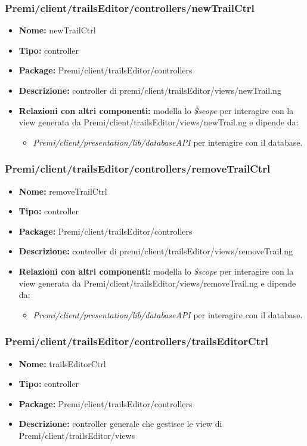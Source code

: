 \subsubsection{Premi/client/trailsEditor/controllers/newTrailCtrl}
\begin{itemize}
  \item[] \textbf{Nome:} newTrailCtrl
  \item[] \textbf{Tipo:} controller
  \item[] \textbf{Package:} Premi/client/trailsEditor/controllers
  \item[] \textbf{Descrizione:} controller di premi/client/trailsEditor/views/newTrail.ng
  \item[] \textbf{Relazioni con altri componenti:} modella lo \textit{\$scope} per interagire con la view generata da Premi/client/trailsEditor/views/newTrail.ng e dipende da:
  \begin{itemize}
  	\item \textit{Premi/client/presentation/lib/databaseAPI} per interagire con il database.
  \end{itemize}
\end{itemize}
\subsubsection{Premi/client/trailsEditor/controllers/removeTrailCtrl}
\begin{itemize}
  \item[] \textbf{Nome:} removeTrailCtrl
  \item[] \textbf{Tipo:} controller
  \item[] \textbf{Package:} Premi/client/trailsEditor/controllers
  \item[] \textbf{Descrizione:} controller di premi/client/trailsEditor/views/removeTrail.ng
  \item[] \textbf{Relazioni con altri componenti:} modella lo \textit{\$scope} per interagire con la view generata da Premi/client/trailsEditor/views/removeTrail.ng e dipende da:
  \begin{itemize}
  	\item \textit{Premi/client/presentation/lib/databaseAPI} per interagire con il database.
  \end{itemize}
\end{itemize}
\subsubsection{Premi/client/trailsEditor/controllers/trailsEditorCtrl}
\begin{itemize}
  \item[] \textbf{Nome:} trailsEditorCtrl
  \item[] \textbf{Tipo:} controller
  \item[] \textbf{Package:} Premi/client/trailsEditor/controllers
  \item[] \textbf{Descrizione:} controller generale che gestisce le view di Premi/client/trailsEditor/views
\end{itemize}
